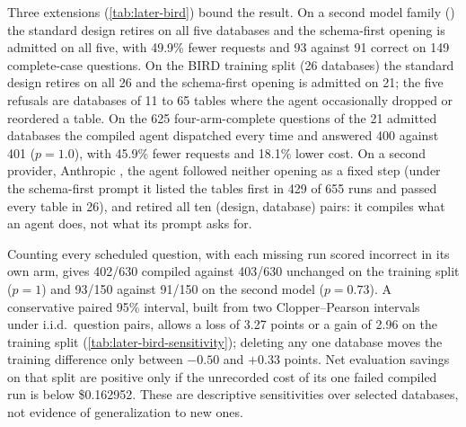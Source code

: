 Three extensions (\cref{tab:later-bird}) bound the result. On a second model family
() the standard design retires on all five databases and the
schema-first opening is admitted on all five, with 49.9\% fewer requests and 93 against
91 correct on 149 complete-case questions. On the BIRD training split (26 databases) the
standard design retires on all 26 and the schema-first opening is admitted on 21; the
five refusals are databases of 11 to 65 tables where the agent occasionally dropped or
reordered a table. On the 625 four-arm-complete questions of the 21 admitted databases the
compiled agent dispatched every time and answered 400 against 401 ($p=1.0$), with 45.9\%
fewer requests and 18.1\% lower cost. On a second provider, Anthropic
, the agent followed neither opening as a fixed step (under the
schema-first prompt it listed the tables first in 429 of 655 runs and passed every table
in 26), and \method retired all ten (design, database) pairs: it compiles what an agent
does, not what its prompt asks for.

Counting every scheduled question, with each missing run scored incorrect in its own arm,
gives 402/630 compiled against 403/630 unchanged on the training split ($p=1$) and 93/150
against 91/150 on the second model ($p=0.73$). A conservative paired 95\% interval,
built from two Clopper--Pearson intervals~\cite{clopper1934binomial} under i.i.d.\
question pairs, allows a loss of 3.27 points or a gain of 2.96 on the training split
(\cref{tab:later-bird-sensitivity}); deleting any one database moves the training
difference only between $-0.50$ and $+0.33$ points. Net evaluation savings on that split
are positive only if the unrecorded cost of its one failed compiled run is below
\$0.162952. These are descriptive sensitivities over selected databases, not evidence of
generalization to new ones.

\begin{table}[t]
  \centering
  \caption{Retrospective BIRD quality sensitivity on all scheduled questions. Differences
  are compiled minus unchanged, in percentage points; intervals assume i.i.d.\ question
  pairs. ``Delete-one'' omits each database in turn and is a descriptive range, not a
  confidence interval. The last column counts databases with positive, zero, or negative
  differences.}
  \label{tab:later-bird-sensitivity}
  \footnotesize
  \resizebox{\ifdim\width>\columnwidth\columnwidth\else\width\fi}{!}{}
\end{table}

